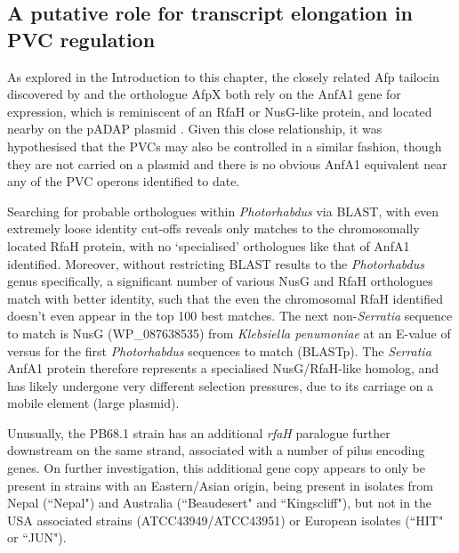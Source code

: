 \subsection{A putative role for transcript elongation in PVC regulation}
As explored in the Introduction to this chapter, the closely related Afp tailocin discovered by \cite{Hurst2004} and the orthologue AfpX \citep{Hurst2018} both rely on the AnfA1 gene for expression, which is reminiscent of an RfaH or NusG-like protein, and located nearby on the pADAP plasmid \citep{Hurst2007a}. Given this close relationship, it was hypothesised that the PVCs may also be controlled in a similar fashion, though they are not carried on a plasmid and there is no obvious AnfA1 equivalent near any of the PVC operons identified to date.

Searching for probable orthologues within \emph{Photorhabdus} via BLAST, with even extremely loose identity cut-offs reveals only matches to the chromosomally located RfaH protein, with no `specialised' orthologues like that of AnfA1 identified. Moreover, without restricting BLAST results to the \emph{Photorhabdus} genus specifically, a significant number of various NusG and RfaH orthologues match with better identity, such that the even the chromosomal RfaH identified doesn't even appear in the top 100 best matches. The next non-\emph{Serratia} sequence to match is NusG (WP\_087638535) from \emph{Klebsiella penumoniae} at an E-value of  versus  for the first \emph{Photorhabdus} sequences to match (BLASTp). The \emph{Serratia} AnfA1 protein therefore represents a specialised NusG/RfaH-like homolog, and has likely undergone very different selection pressures, due to its carriage on a mobile element (large plasmid).

Unusually, the PB68.1 strain has an additional \emph{rfaH} paralogue further downstream on the same strand, associated with a number of pilus encoding genes. On further investigation, this additional gene copy appears to only be present in \Pasy{} strains with an Eastern/Asian origin, being present in isolates from Nepal (``Nepal") and Australia (``Beaudesert" and ``Kingscliff"), but not in the USA associated strains (ATCC43949/ATCC43951) or European isolates (``HIT" or ``JUN").

